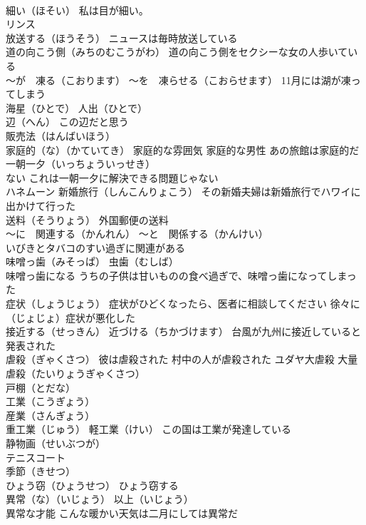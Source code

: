 \documentclass[8pt]{extreport}
\begin{document}
\begin{CJK}{UTF8}{min}
\\	細い（ほそい） 私は目が細い。
\\	リンス
\\	放送する（ほうそう） ニュースは毎時放送している
\\	道の向こう側（みちのむこうがわ） 道の向こう側をセクシーな女の人歩いている
\\	～が　凍る（こおります） ～を　凍らせる（こおらせます） 11月には湖が凍ってしまう
\\	海星（ひとで） 人出（ひとで）
\\	辺（へん） この辺だと思う
\\	販売法（はんばいほう）
\\	家庭的（な）（かていてき） 家庭的な雰囲気 家庭的な男性 あの旅館は家庭的だ
\\	一朝一夕（いっちょういっせき）　
\\	ない これは一朝一夕に解決できる問題じゃない
\\	ハネムーン 新婚旅行（しんこんりょこう） その新婚夫婦は新婚旅行でハワイに出かけて行った
\\	送料（そうりょう） 外国郵便の送料
\\	～に　関連する（かんれん） ～と　関係する（かんけい）
\\	いびきとタバコのすい過ぎに関連がある
\\	味噌っ歯（みそっぱ） 虫歯（むしば）
\\	味噌っ歯になる うちの子供は甘いものの食べ過ぎで、味噌っ歯になってしまった
\\	症状（しょうじょう） 症状がひどくなったら、医者に相談してください 徐々に（じょじょ）症状が悪化した
\\	接近する（せっきん） 近づける（ちかづけます） 台風が九州に接近していると発表された
\\	虐殺（ぎゃくさつ） 彼は虐殺された 村中の人が虐殺された ユダヤ大虐殺 大量虐殺（たいりょうぎゃくさつ）
\\	戸棚（とだな） 
\\	工業（こうぎょう）
\\	産業（さんぎょう）
\\	重工業（じゅう） 軽工業（けい） この国は工業が発達している
\\	静物画（せいぶつが）
\\	テニスコート
\\	季節（きせつ）
\\	ひょう窃（ひょうせつ） ひょう窃する
\\	異常（な）（いじょう） 以上（いじょう）
\\	異常な才能 こんな暖かい天気は二月にしては異常だ

\end{CJK}
\end{document}
